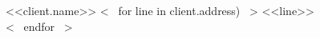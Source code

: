 \begin{billto}{<<client.name>>}
	<~ for line in client.address) ~>
		<<line>>\\
	<~ endfor ~>
\end{billto}

